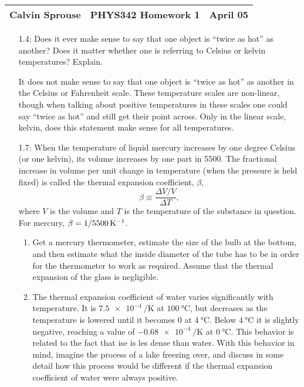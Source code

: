 \documentclass[a4paper, 12pt]{config/homework}
\begin{document}
\noindent
\begin{tabularx}{\textwidth}{>{\centering\arraybackslash}X>{\centering\arraybackslash}X>{\centering\arraybackslash}X}
Calvin Sprouse & PHYS342 Homework 1 & 2024 April 05\\
\midrule
\end{tabularx}

\vspace{\baselineskip}
\begin{enumerate}
\item[1.4:] Does it ever make sense to say that one object is ``twice as hot'' as another? Does it matter whether one is referring to Celsius or kelvin temperatures? Explain.

It does not make sense to say that one object is ``twice as hot'' as another in the Celsius or Fahrenheit scale. These temperature scales are non-linear, though when talking about positive temperatures in these scales one could say ``twice as hot'' and still get their point across. Only in the linear scale, kelvin, does this statement make sense for all temperatures.

\vspace{\baselineskip}
\item[1.7:] When the temperature of liquid mercury increases by one degree Celsius (or one kelvin), its volume increases by one part in 5500. The fractional increase in volume per unit change in temperature (when the pressure is held fixed) is called the thermal expansion coefficient, \(\beta\),
\[\beta \equiv \frac{\Delta V / V}{\Delta T},\]
where \(V\) is the volume and \(T\) is the temperature of the substance in question. For mercury, \(\beta=\qty[parse-numbers=false]{1/5500}{\per\kelvin}\).
\begin{enumerate}[label=(\alph*.)]
\item Get a mercury thermometer, estimate the size of the bulb at the bottom, and then estimate what the inside diameter of the tube has to be in order for the thermometer to work as required. Assume that the thermal expansion of the glass is negligible.



\item The thermal expansion coefficient of water varies significantly with temperature. It is \(\qty{7.5e-4}{\per\kelvin}\) at \(\qty{100}{\celsius}\), but decreases as the temperature is lowered until it becomes 0 at \(\qty{4}{\celsius}\). Below \(\qty{4}{\celsius}\) it is slightly negative, reaching a value of \(\qty{-0.68e-4}{\per\kelvin}\) at \(\qty{0}{\celsius}\). This behavior is related to the fact that ise is les dense than water. With this behavior in mind, imagine the process of a lake freezing over, and discuss in some detail how this process would be different if the thermal expansion coefficient of water were always positive.




\end{enumerate}
\end{enumerate}
\end{document}
